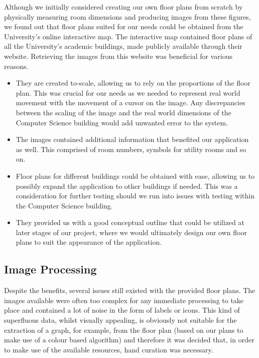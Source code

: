 \documentclass[12pt,a4paper]{report}
\begin{document}
Although we initially considered creating our own floor plans from scratch by physically measuring room dimensions and producing images from these figures, we found out that floor plans suited for our needs could be obtained from the University's online interactive map. The interactive map contained floor plans of all the University's academic buildings, made publicly available through their website. Retrieving the images from this website was beneficial for various reasons.

\begin{itemize}

\item They are created to-scale, allowing us to rely on the proportions of the floor plan. This was crucial for our needs as we needed to represent real world movement with the movement of a cursor on the image. Any discrepancies between the scaling of the image and the real world dimensions of the Computer Science building would add unwanted error to the system.

\item The images contained additional information that benefited our application as well. This comprised of room numbers, symbols for utility rooms and so on.

\item Floor plans for different buildings could be obtained with ease, allowing us to possibly expand the application to other buildings if needed. This was a consideration for further testing should we run into issues with testing within the Computer Science building.

\item They provided us with a good conceptual outline that could be utilized at later stages of our project, where we would ultimately design our own floor plans to suit the appearance of the application.
\end{itemize}
		
\subsection{Image Processing}

Despite the benefits, several issues still existed with the provided floor plans. The images available were often too complex for any immediate processing to take place and contained a lot of noise in the form of labels or icons. This kind of superfluous data, whilst visually appealing, is obviously not suitable for the extraction of a graph, for example, from the floor plan (based on our plans to make use of a colour based algorithm) and therefore it was decided that, in order to make use of the available resources, hand curation was necessary.
\end{document}
